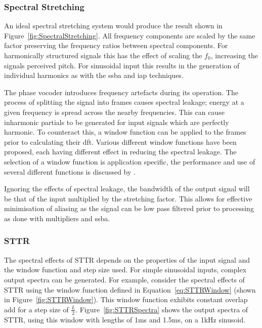 		\subsubsection*{Spectral Stretching}
			An ideal spectral stretching system would produce the result shown in
			Figure~\ref{fig:SpectralStretching}. All frequency components are scaled by the same factor
			preserving the frequency ratios between spectral components. For harmonically structured signals
			this has the effect of scaling the $f_{0}$, increasing the signals perceived pitch. For sinusoidal
			input this results in the generation of individual harmonics as with the \acrshort{ssba} and
			\acrshort{iap} techniques.
			
			The phase vocoder introduces frequency artefacts during its operation. The process of splitting the
			signal into frames causes spectral leakage; energy at a given frequency is spread across the nearby
			frequencies. This can cause inharmonic partials to be generated for input signals which are
			perfectly harmonic. To counteract this, a window function can be applied to the frames prior to
			calculating their \acrshort{dft}. Various different window functions have been proposed, each
			having different effect in reducing the spectral leakage. The selection of a window function is
			application specific, the performance and use of several different functions is discussed by
			\citet{harris1978on}.
			
			Ignoring the effects of spectral leakage, the bandwidth of the output signal will be that of the
			input multiplied by the stretching factor. This allows for effective minimisation of aliasing as
			the signal can be low pass filtered prior to processing as done with multipliers and
			\acrshort{ssba}.
		
		\subsubsection*{STTR}
			The spectral effects of STTR depends on the properties of the input signal and the window function
			and step size used. For simple sinusoidal inputs, complex output spectra can be generated. For
			example, consider the spectral effects of STTR using the window function defined in
			Equation~\ref{eq:STTRWindow} (shown in Figure~\ref{fig:STTRWindow}). This window function exhibits
			constant overlap add for a step size of $\frac{L}{2}$. Figure~\ref{fig:STTRSpectra} shows the
			output spectra of STTR, using this window with lengths of 1ms and 1.5ms, on a 1kHz sinusoid.

